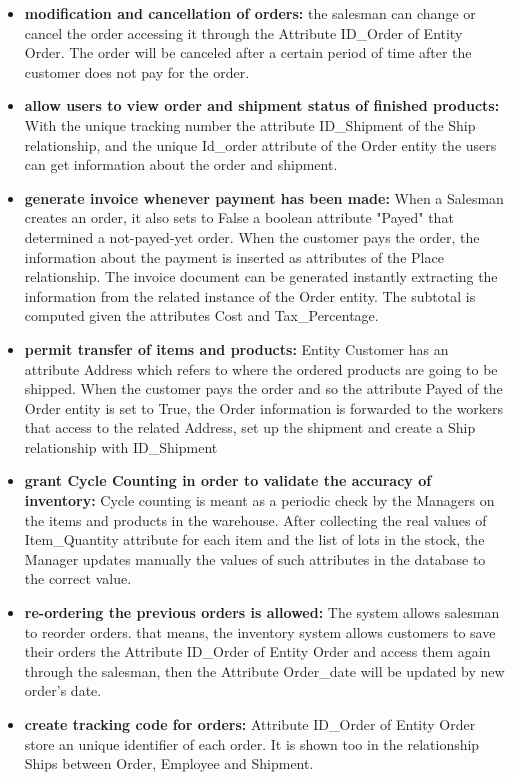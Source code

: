 \begin{itemize}
    \item \textbf{modification and cancellation of orders:} the salesman can change or cancel the order accessing it through the Attribute ID\_Order of Entity Order. The order will be canceled after a certain period of time after the customer does not pay for the order.
    \item \textbf{allow users to view order and shipment status of finished products:} With the unique tracking number the attribute ID\_Shipment of the Ship relationship, and the unique Id\_order attribute of the Order entity the users can get information about the order and shipment.
    \item \textbf{generate invoice whenever payment has been made:} When a Salesman creates an order, it also sets to False a boolean attribute "Payed" that determined a not-payed-yet order. When the customer pays the order, the information about the payment is inserted as attributes of the Place relationship. The invoice document can be generated instantly extracting the information from the related instance of the Order entity. The subtotal is computed given the attributes Cost and Tax\_Percentage.
    \item \textbf{permit transfer of items and products:} Entity Customer has an attribute Address which refers to where the ordered products are going to be shipped. When the customer pays the order and so the attribute Payed of the Order entity is set to True, the Order information is forwarded to the workers that access to the related Address, set up the shipment and create a Ship relationship with ID\_Shipment
    \item \textbf{grant Cycle Counting in order to validate the accuracy of inventory:} Cycle counting is meant as a periodic check by the Managers on the items and products in the warehouse. After collecting the real values of Item\_Quantity attribute for each item and the list of lots in the stock, the Manager updates manually the values of such attributes in the database to the correct value.
    \item \textbf{re-ordering the previous orders is allowed:} The system allows salesman to reorder orders. that means, the inventory system allows customers to save their orders the Attribute ID\_Order of Entity Order and access them again through the salesman, then the Attribute Order\_date will be updated by new order's date.
    \item \textbf{create tracking code for orders:} Attribute ID\_Order of Entity Order store an unique identifier of each order. It is shown too in the relationship Ships between Order, Employee and Shipment.
\end{itemize}








